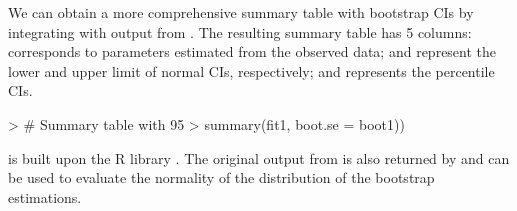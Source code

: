 We can obtain a more comprehensive summary table with bootstrap CIs by integrating  with output from . The resulting summary table has 5 columns:  corresponds to parameters estimated from the observed data;  and  represent the lower and upper limit of normal CIs, respectively;  and  represents the percentile CIs.
\begin{example}
> # Summary table with 95%
> summary(fit1, boot.se = boot1))
\end{example}
 is built upon the R library  \citep{canty2021boot}. The original output from  is also returned by  and can be used to evaluate the normality of the distribution of the bootstrap estimations.
